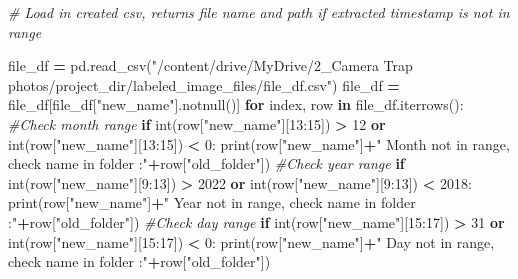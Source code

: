 \documentclass[
]{article}
\newenvironment{Shaded}{\begin{snugshade}}{\end{snugshade}}
\newcommand{\BuiltInTok}[1]{#1}
\newcommand{\CommentTok}[1]{\textcolor[rgb]{0.56,0.35,0.01}{\textit{#1}}}
\newcommand{\ControlFlowTok}[1]{\textcolor[rgb]{0.13,0.29,0.53}{\textbf{#1}}}
\newcommand{\DecValTok}[1]{\textcolor[rgb]{0.00,0.00,0.81}{#1}}
\newcommand{\KeywordTok}[1]{\textcolor[rgb]{0.13,0.29,0.53}{\textbf{#1}}}
\newcommand{\NormalTok}[1]{#1}
\newcommand{\OperatorTok}[1]{\textcolor[rgb]{0.81,0.36,0.00}{\textbf{#1}}}
\newcommand{\StringTok}[1]{\textcolor[rgb]{0.31,0.60,0.02}{#1}}
\begin{document}
\begin{Shaded}
\begin{Highlighting}[]
\CommentTok{\# Load in created csv, returns file name and path if extracted timestamp is not in range}

\NormalTok{file\_df }\OperatorTok{=}\NormalTok{ pd.read\_csv(}\StringTok{"/content/drive/MyDrive/2\_Camera Trap photos/project\_dir/labeled\_image\_files/file\_df.csv"}\NormalTok{)}
\NormalTok{file\_df }\OperatorTok{=}\NormalTok{ file\_df[file\_df[}\StringTok{"new\_name"}\NormalTok{].notnull()]}
\ControlFlowTok{for}\NormalTok{ index, row }\KeywordTok{in}\NormalTok{ file\_df.iterrows():}
  \CommentTok{\#Check month range}
  \ControlFlowTok{if} \BuiltInTok{int}\NormalTok{(row[}\StringTok{"new\_name"}\NormalTok{][}\DecValTok{13}\NormalTok{:}\DecValTok{15}\NormalTok{]) }\OperatorTok{\textgreater{}} \DecValTok{12} \KeywordTok{or} \BuiltInTok{int}\NormalTok{(row[}\StringTok{"new\_name"}\NormalTok{][}\DecValTok{13}\NormalTok{:}\DecValTok{15}\NormalTok{]) }\OperatorTok{\textless{}} \DecValTok{0}\NormalTok{:}
    \BuiltInTok{print}\NormalTok{(row[}\StringTok{"new\_name"}\NormalTok{]}\OperatorTok{+}\StringTok{" Month not in range, check name in folder :"}\OperatorTok{+}\NormalTok{row[}\StringTok{"old\_folder"}\NormalTok{])}
  \CommentTok{\#Check year range}
  \ControlFlowTok{if} \BuiltInTok{int}\NormalTok{(row[}\StringTok{"new\_name"}\NormalTok{][}\DecValTok{9}\NormalTok{:}\DecValTok{13}\NormalTok{]) }\OperatorTok{\textgreater{}} \DecValTok{2022} \KeywordTok{or} \BuiltInTok{int}\NormalTok{(row[}\StringTok{"new\_name"}\NormalTok{][}\DecValTok{9}\NormalTok{:}\DecValTok{13}\NormalTok{]) }\OperatorTok{\textless{}} \DecValTok{2018}\NormalTok{:}
    \BuiltInTok{print}\NormalTok{(row[}\StringTok{"new\_name"}\NormalTok{]}\OperatorTok{+}\StringTok{" Year not in range, check name in folder :"}\OperatorTok{+}\NormalTok{row[}\StringTok{"old\_folder"}\NormalTok{])}
  \CommentTok{\#Check day range}
  \ControlFlowTok{if} \BuiltInTok{int}\NormalTok{(row[}\StringTok{"new\_name"}\NormalTok{][}\DecValTok{15}\NormalTok{:}\DecValTok{17}\NormalTok{]) }\OperatorTok{\textgreater{}} \DecValTok{31} \KeywordTok{or} \BuiltInTok{int}\NormalTok{(row[}\StringTok{"new\_name"}\NormalTok{][}\DecValTok{15}\NormalTok{:}\DecValTok{17}\NormalTok{]) }\OperatorTok{\textless{}} \DecValTok{0}\NormalTok{:}
    \BuiltInTok{print}\NormalTok{(row[}\StringTok{"new\_name"}\NormalTok{]}\OperatorTok{+}\StringTok{" Day not in range, check name in folder :"}\OperatorTok{+}\NormalTok{row[}\StringTok{"old\_folder"}\NormalTok{])}
\end{Highlighting}
\end{Shaded}
\end{document}
